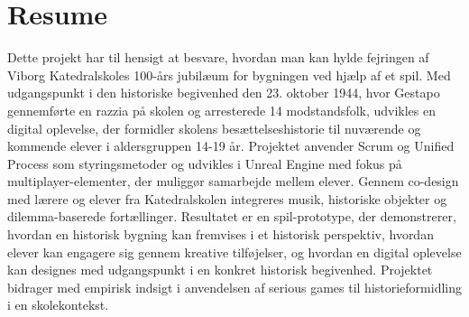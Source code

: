     \section{Resume}

    Dette projekt har til hensigt at besvare, hvordan man kan hylde fejringen af Viborg Katedralskoles 100-års jubilæum for bygningen ved hjælp af et spil. Med udgangspunkt i den historiske begivenhed den 23. oktober 1944, hvor Gestapo gennemførte en razzia på skolen og arresterede 14 modstandsfolk, udvikles en digital oplevelse, der formidler skolens besættelseshistorie til nuværende og kommende elever i aldersgruppen 14-19 år. Projektet anvender Scrum og Unified Process som styringsmetoder og udvikles i Unreal Engine med fokus på multiplayer-elementer, der muliggør samarbejde mellem elever. Gennem co-design med lærere og elever fra Katedralskolen integreres musik, historiske objekter og dilemma-baserede fortællinger. Resultatet er en spil-prototype, der demonstrerer, hvordan en historisk bygning kan fremvises i et historisk perspektiv, hvordan elever kan engagere sig gennem kreative tilføjelser, og hvordan en digital oplevelse kan designes med udgangspunkt i en konkret historisk begivenhed. Projektet bidrager med empirisk indsigt i anvendelsen af serious games til historieformidling i en skolekontekst.
